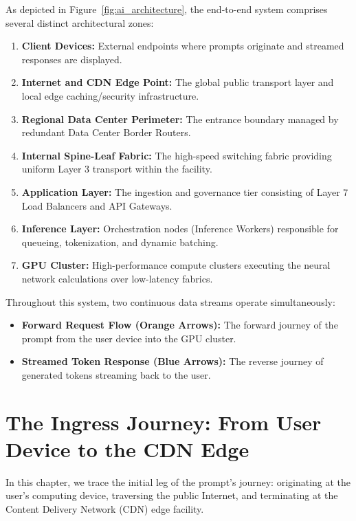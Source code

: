 \documentclass[12pt,a4paper]{report}
\begin{document}
As depicted in Figure~\ref{fig:ai_architecture}, the end-to-end system comprises several distinct architectural zones:
\begin{enumerate}[leftmargin=1.2cm]
    \item \textbf{Client Devices:} External endpoints where prompts originate and streamed responses are displayed.
    \item \textbf{Internet and CDN Edge Point:} The global public transport layer and local edge caching/security infrastructure.
    \item \textbf{Regional Data Center Perimeter:} The entrance boundary managed by redundant Data Center Border Routers.
    \item \textbf{Internal Spine-Leaf Fabric:} The high-speed switching fabric providing uniform Layer 3 transport within the facility.
    \item \textbf{Application Layer:} The ingestion and governance tier consisting of Layer 7 Load Balancers and API Gateways.
    \item \textbf{Inference Layer:} Orchestration nodes (Inference Workers) responsible for queueing, tokenization, and dynamic batching.
    \item \textbf{GPU Cluster:} High-performance compute clusters executing the neural network calculations over low-latency fabrics.
\end{enumerate}

Throughout this system, two continuous data streams operate simultaneously:
\begin{itemize}
    \item \textbf{Forward Request Flow (Orange Arrows):} The forward journey of the prompt from the user device into the GPU cluster.
    \item \textbf{Streamed Token Response (Blue Arrows):} The reverse journey of generated tokens streaming back to the user.
\end{itemize}

\chapter{The Ingress Journey: From User Device to the CDN Edge}

In this chapter, we trace the initial leg of the prompt's journey: originating at the user's computing device, traversing the public Internet, and terminating at the Content Delivery Network (CDN) edge facility.
\end{document}

